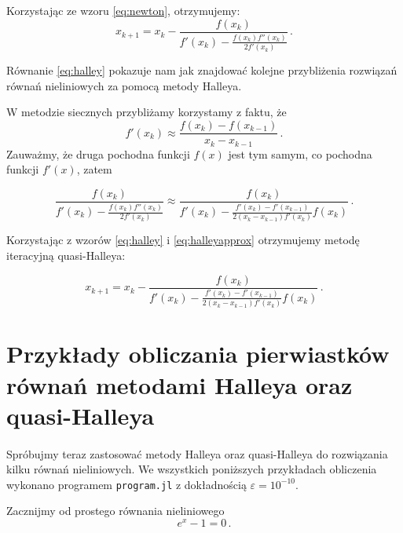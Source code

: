 \documentclass{article}
\begin{document}
    Korzystając ze wzoru \eqref{eq:newton}, otrzymujemy:
    \begin{equation}\label{eq:halley}
      x_{k+1} = x_{k} - \frac{f(x_k)}{f'(x_k) - \frac{f(x_k)f''(x_k)}{2f'(x_k)}}\,.
    \end{equation}

    Równanie \eqref{eq:halley} pokazuje nam jak znajdować kolejne przybliżenia
    rozwiązań równań nieliniowych za pomocą metody Halleya.

    W metodzie siecznych przybliżamy korzystamy z faktu, że
    \begin{equation*}
      f'(x_k) \approx \frac{f(x_k) - f(x_{k-1})}{x_k - x_{k-1}}\,.
    \end{equation*}
    Zauważmy, że druga pochodna funkcji $f(x)$ jest tym samym, co pochodna funkcji
    $f'(x)$, zatem

    \begin{equation}\label{eq:halleyapprox}
      \frac{f(x_k)}{f'(x_k) - \frac{f(x_k)f''(x_k)}{2f'(x_k)}} \approx \frac{f(x_k)}{f'(x_k) - \frac{f'(x_k) - f'(x_{k-1})}{2(x_k - x_{k-1})f'(x_k)}f(x_k)} \,.
    \end{equation}

    Korzystając z wzorów \eqref{eq:halley} i \eqref{eq:halleyapprox} otrzymujemy
    metodę iteracyjną quasi-Halleya:

    \begin{equation*}
      x_{k+1} = x_{k} - \frac{f(x_k)}{f'(x_k) - \frac{f'(x_k) - f'(x_{k-1})}{2(x_k - x_{k-1})f'(x_k)}f(x_k)}\,.
    \end{equation*}

  \section{Przykłady obliczania pierwiastków równań metodami Halleya oraz quasi-Halleya}
  \label{sec:examples}

    \paragraph{} Spróbujmy teraz zastosować metody Halleya oraz quasi-Halleya do
    rozwiązania kilku równań nieliniowych. We wszystkich poniższych przykładach
    obliczenia wykonano programem \texttt{program.jl} z dokładnością $\varepsilon = 10^{-10}$.

    Zacznijmy od prostego równania nieliniowego
    \begin{equation*}
      e^{x} - 1 = 0 \,.
    \end{equation*}
\end{document}
